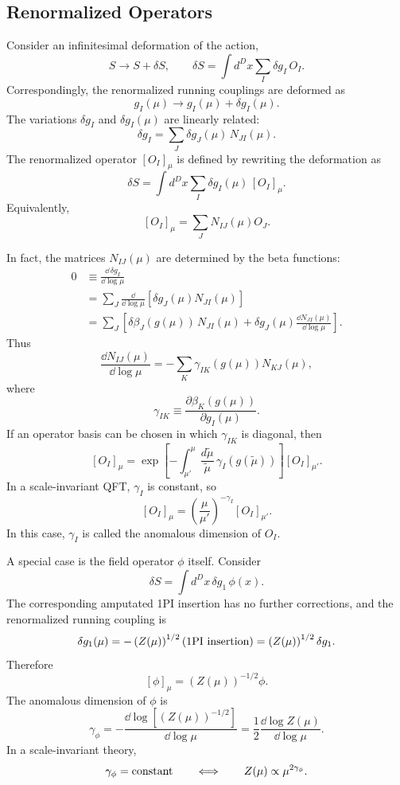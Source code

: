 \subsection{Renormalized Operators}

Consider an infinitesimal deformation of the action,
\[
  S\longrightarrow S+\delta S,
  \qquad
  \delta S=\int d^Dx\sum_I\delta g_I\,O_I .
\]
Correspondingly, the renormalized running couplings are deformed as
\[
  g_I(\mu)\longrightarrow g_I(\mu)+\delta g_I(\mu).
\]
The variations \(\delta g_I\) and \(\delta g_I(\mu)\) are linearly related:
\[
  \delta g_I
  =
  \sum_J\delta g_J(\mu)\,N_{JI}(\mu).
\]
The renormalized operator \([O_I]_\mu\) is defined by rewriting the deformation
as
\[
  \delta S=\int d^Dx\sum_I\delta g_I(\mu)\,[O_I]_\mu.
\]
Equivalently,
\[
  [O_I]_\mu=\sum_J N_{IJ}(\mu)O_J .
\]

In fact, the matrices \(N_{IJ}(\mu)\) are determined by the beta functions:
\[
\begin{split}
  0
  &\equiv
  \frac{\dd\,\delta g_I}{\dd\log\mu}
\\
  &=
  \sum_J
  \frac{\dd}{\dd\log\mu}
  \left[
    \delta g_J(\mu)N_{JI}(\mu)
  \right]
\\
  &=
  \sum_J
  \left[
    \delta\beta_J(g(\mu))\,N_{JI}(\mu)
    +\delta g_J(\mu)
    \frac{\dd N_{JI}(\mu)}{\dd\log\mu}
  \right].
\end{split}
\]
Thus
\[
  \frac{\dd N_{IJ}(\mu)}{\dd\log\mu}
  =
  -\sum_K \gamma_{IK}(g(\mu))N_{KJ}(\mu),
\]
where
\[
  \gamma_{IK}\equiv
  \frac{\partial\beta_K(g(\mu))}{\partial g_I(\mu)}.
\]
If an operator basis can be chosen in which \(\gamma_{IK}\) is diagonal, then
\[
  [O_I]_\mu
  =
  \exp\left[
    -\int_{\mu'}^\mu
    \frac{d\widetilde\mu}{\widetilde\mu}\,
    \gamma_I(g(\widetilde\mu))
  \right]
  [O_I]_{\mu'}.
\]
In a scale-invariant QFT, \(\gamma_I\) is constant, so
\[
  [O_I]_\mu
  =
  \left(\frac{\mu}{\mu'}\right)^{-\gamma_I}
  [O_I]_{\mu'}.
\]
In this case, \(\gamma_I\) is called the anomalous dimension of \(O_I\).

A special case is the field operator \(\phi\) itself.  Consider
\[
  \delta S=\int d^Dx\,\delta g_1\,\phi(x).
\]
The corresponding amputated 1PI insertion has no further corrections, and
the renormalized running coupling is
\[
  \delta g_1(\mu)
  =
  -\left(Z(\mu)\right)^{1/2}(\hbox{1PI insertion})
  =
  \left(Z(\mu)\right)^{1/2}\delta g_1 .
\]
Therefore
\[
  [\phi]_\mu=\left(Z(\mu)\right)^{-1/2}\phi.
\]
The anomalous dimension of \(\phi\) is
\[
  \gamma_\phi
  =
  -\frac{\dd\log\left[(Z(\mu))^{-1/2}\right]}{\dd\log\mu}
  =
  \frac{1}{2}\frac{\dd\log Z(\mu)}{\dd\log\mu}.
\]
In a scale-invariant theory,
\[
  \gamma_\phi=\hbox{constant}
  \qquad\Longleftrightarrow\qquad
  Z(\mu)\propto \mu^{2\gamma_\phi}.
\]


